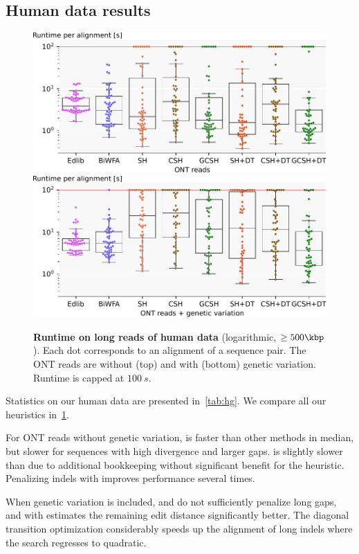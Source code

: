 \subsection{Human data results}\label{app:human}



\begin{figure}[t]
  \centering
  \includegraphics[scale=0.55]{plots/real_full_without_bio_var.pdf}\\
  \includegraphics[scale=0.55]{plots/real_full_with_bio_var.pdf}%
  \caption[Runtime on long reads of human data]{\textbf{Runtime on long reads of
    human data} (logarithmic, $\geq 500\kbp$). Each dot corresponds to an
    alignment of a sequence pair. The ONT reads are without (top) and with
    (bottom) genetic variation. Runtime is capped at $\qty{100}{s}$.}
  \label{fig:human-full}
\end{figure}

Statistics on our human data are presented in~\cref{tab:hg}. We compare all our
heuristics in~\cref{fig:human-full}.

For ONT reads without genetic variation, \SH is faster than other methods in
median, but slower for sequences with high divergence and larger gaps.
\CSH is slightly slower than \SH due to additional bookkeeping without
significant benefit for the heuristic. Penalizing indels with \GCH improves
performance several times.

When genetic variation is included, \SH and \CSH do not sufficiently penalize
long gaps, and \A with \GCH estimates the remaining edit distance significantly
better. The diagonal transition optimization considerably speeds up the
alignment of long indels where the search regresses to quadratic.
